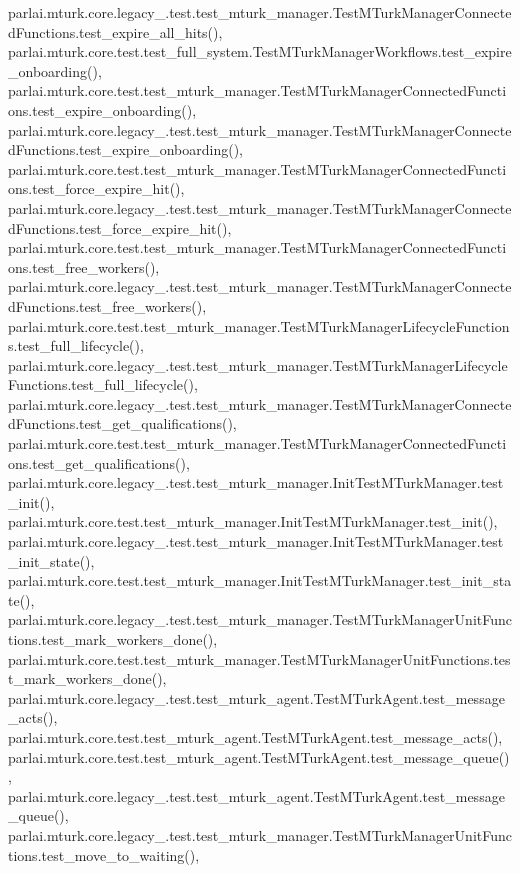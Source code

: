 parlai.\+mturk.\+core.\+legacy\+\_.\+test.\+test\+\_\+mturk\+\_\+manager.\+Test\+M\+Turk\+Manager\+Connected\+Functions.\+test\+\_\+expire\+\_\+all\+\_\+hits(), parlai.\+mturk.\+core.\+test.\+test\+\_\+full\+\_\+system.\+Test\+M\+Turk\+Manager\+Workflows.\+test\+\_\+expire\+\_\+onboarding(), parlai.\+mturk.\+core.\+test.\+test\+\_\+mturk\+\_\+manager.\+Test\+M\+Turk\+Manager\+Connected\+Functions.\+test\+\_\+expire\+\_\+onboarding(), parlai.\+mturk.\+core.\+legacy\+\_.\+test.\+test\+\_\+mturk\+\_\+manager.\+Test\+M\+Turk\+Manager\+Connected\+Functions.\+test\+\_\+expire\+\_\+onboarding(), parlai.\+mturk.\+core.\+test.\+test\+\_\+mturk\+\_\+manager.\+Test\+M\+Turk\+Manager\+Connected\+Functions.\+test\+\_\+force\+\_\+expire\+\_\+hit(), parlai.\+mturk.\+core.\+legacy\+\_.\+test.\+test\+\_\+mturk\+\_\+manager.\+Test\+M\+Turk\+Manager\+Connected\+Functions.\+test\+\_\+force\+\_\+expire\+\_\+hit(), parlai.\+mturk.\+core.\+test.\+test\+\_\+mturk\+\_\+manager.\+Test\+M\+Turk\+Manager\+Connected\+Functions.\+test\+\_\+free\+\_\+workers(), parlai.\+mturk.\+core.\+legacy\+\_.\+test.\+test\+\_\+mturk\+\_\+manager.\+Test\+M\+Turk\+Manager\+Connected\+Functions.\+test\+\_\+free\+\_\+workers(), parlai.\+mturk.\+core.\+test.\+test\+\_\+mturk\+\_\+manager.\+Test\+M\+Turk\+Manager\+Lifecycle\+Functions.\+test\+\_\+full\+\_\+lifecycle(), parlai.\+mturk.\+core.\+legacy\+\_.\+test.\+test\+\_\+mturk\+\_\+manager.\+Test\+M\+Turk\+Manager\+Lifecycle\+Functions.\+test\+\_\+full\+\_\+lifecycle(), parlai.\+mturk.\+core.\+legacy\+\_.\+test.\+test\+\_\+mturk\+\_\+manager.\+Test\+M\+Turk\+Manager\+Connected\+Functions.\+test\+\_\+get\+\_\+qualifications(), parlai.\+mturk.\+core.\+test.\+test\+\_\+mturk\+\_\+manager.\+Test\+M\+Turk\+Manager\+Connected\+Functions.\+test\+\_\+get\+\_\+qualifications(), parlai.\+mturk.\+core.\+legacy\+\_.\+test.\+test\+\_\+mturk\+\_\+manager.\+Init\+Test\+M\+Turk\+Manager.\+test\+\_\+init(), parlai.\+mturk.\+core.\+test.\+test\+\_\+mturk\+\_\+manager.\+Init\+Test\+M\+Turk\+Manager.\+test\+\_\+init(), parlai.\+mturk.\+core.\+legacy\+\_.\+test.\+test\+\_\+mturk\+\_\+manager.\+Init\+Test\+M\+Turk\+Manager.\+test\+\_\+init\+\_\+state(), parlai.\+mturk.\+core.\+test.\+test\+\_\+mturk\+\_\+manager.\+Init\+Test\+M\+Turk\+Manager.\+test\+\_\+init\+\_\+state(), parlai.\+mturk.\+core.\+legacy\+\_.\+test.\+test\+\_\+mturk\+\_\+manager.\+Test\+M\+Turk\+Manager\+Unit\+Functions.\+test\+\_\+mark\+\_\+workers\+\_\+done(), parlai.\+mturk.\+core.\+test.\+test\+\_\+mturk\+\_\+manager.\+Test\+M\+Turk\+Manager\+Unit\+Functions.\+test\+\_\+mark\+\_\+workers\+\_\+done(), parlai.\+mturk.\+core.\+legacy\+\_.\+test.\+test\+\_\+mturk\+\_\+agent.\+Test\+M\+Turk\+Agent.\+test\+\_\+message\+\_\+acts(), parlai.\+mturk.\+core.\+test.\+test\+\_\+mturk\+\_\+agent.\+Test\+M\+Turk\+Agent.\+test\+\_\+message\+\_\+acts(), parlai.\+mturk.\+core.\+test.\+test\+\_\+mturk\+\_\+agent.\+Test\+M\+Turk\+Agent.\+test\+\_\+message\+\_\+queue(), parlai.\+mturk.\+core.\+legacy\+\_.\+test.\+test\+\_\+mturk\+\_\+agent.\+Test\+M\+Turk\+Agent.\+test\+\_\+message\+\_\+queue(), parlai.\+mturk.\+core.\+legacy\+\_.\+test.\+test\+\_\+mturk\+\_\+manager.\+Test\+M\+Turk\+Manager\+Unit\+Functions.\+test\+\_\+move\+\_\+to\+\_\+waiting(), 